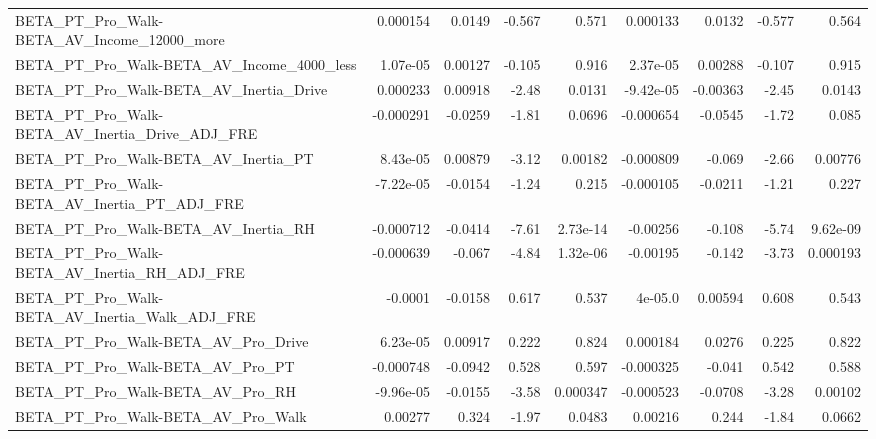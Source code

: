 \begin{tabular}{lrrrrrrrr}
BETA\_PT\_Pro\_Walk-BETA\_AV\_Income\_12000\_more         &    0.000154 &       0.0149 &   -0.567 &    0.571 &   0.000133 &      0.0132 &       -0.577 &         0.564 \\
BETA\_PT\_Pro\_Walk-BETA\_AV\_Income\_4000\_less          &    1.07e-05 &      0.00127 &   -0.105 &    0.916 &   2.37e-05 &     0.00288 &       -0.107 &         0.915 \\
BETA\_PT\_Pro\_Walk-BETA\_AV\_Inertia\_Drive             &    0.000233 &      0.00918 &    -2.48 &   0.0131 &  -9.42e-05 &    -0.00363 &        -2.45 &        0.0143 \\
BETA\_PT\_Pro\_Walk-BETA\_AV\_Inertia\_Drive\_ADJ\_FRE     &   -0.000291 &      -0.0259 &    -1.81 &   0.0696 &  -0.000654 &     -0.0545 &        -1.72 &         0.085 \\
BETA\_PT\_Pro\_Walk-BETA\_AV\_Inertia\_PT                &    8.43e-05 &      0.00879 &    -3.12 &  0.00182 &  -0.000809 &      -0.069 &        -2.66 &       0.00776 \\
BETA\_PT\_Pro\_Walk-BETA\_AV\_Inertia\_PT\_ADJ\_FRE        &   -7.22e-05 &      -0.0154 &    -1.24 &    0.215 &  -0.000105 &     -0.0211 &        -1.21 &         0.227 \\
BETA\_PT\_Pro\_Walk-BETA\_AV\_Inertia\_RH                &   -0.000712 &      -0.0414 &    -7.61 & 2.73e-14 &   -0.00256 &      -0.108 &        -5.74 &      9.62e-09 \\
BETA\_PT\_Pro\_Walk-BETA\_AV\_Inertia\_RH\_ADJ\_FRE        &   -0.000639 &       -0.067 &    -4.84 & 1.32e-06 &   -0.00195 &      -0.142 &        -3.73 &      0.000193 \\
BETA\_PT\_Pro\_Walk-BETA\_AV\_Inertia\_Walk\_ADJ\_FRE      &     -0.0001 &      -0.0158 &    0.617 &    0.537 &    4e-05.0 &     0.00594 &        0.608 &         0.543 \\
BETA\_PT\_Pro\_Walk-BETA\_AV\_Pro\_Drive                 &    6.23e-05 &      0.00917 &    0.222 &    0.824 &   0.000184 &      0.0276 &        0.225 &         0.822 \\
BETA\_PT\_Pro\_Walk-BETA\_AV\_Pro\_PT                    &   -0.000748 &      -0.0942 &    0.528 &    0.597 &  -0.000325 &      -0.041 &        0.542 &         0.588 \\
BETA\_PT\_Pro\_Walk-BETA\_AV\_Pro\_RH                    &   -9.96e-05 &      -0.0155 &    -3.58 & 0.000347 &  -0.000523 &     -0.0708 &        -3.28 &       0.00102 \\
BETA\_PT\_Pro\_Walk-BETA\_AV\_Pro\_Walk                  &     0.00277 &        0.324 &    -1.97 &   0.0483 &    0.00216 &       0.244 &        -1.84 &        0.0662 \\

\end{tabular}
